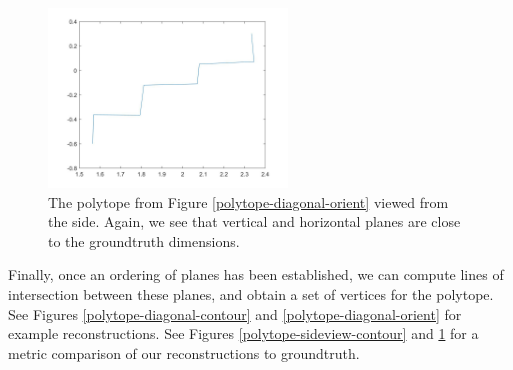 \begin{figure}[!h]
\centering
\includegraphics[width=2.5in]{Sections/Figures/geom_sideview_2d.jpg}
\caption{The polytope from Figure \ref{polytope-diagonal-orient} viewed from the side. Again, we see that vertical and horizontal planes are close to the groundtruth dimensions.}
\label{polytope-sideview-orient}
\end{figure}

Finally, once an ordering of planes has been established, we can compute lines of intersection between these planes, and obtain a set of vertices for the polytope. See Figures \ref{polytope-diagonal-contour} and \ref{polytope-diagonal-orient} for example reconstructions. See Figures \ref{polytope-sideview-contour} and \ref{polytope-sideview-orient} for a metric comparison of our reconstructions to groundtruth.
